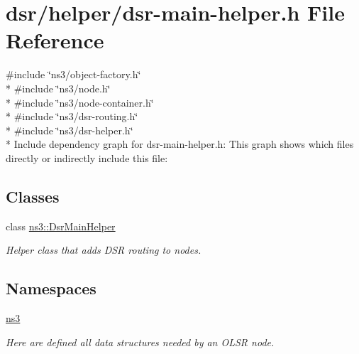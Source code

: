 \hypertarget{dsr-main-helper_8h}{}\section{dsr/helper/dsr-\/main-\/helper.h File Reference}
\label{dsr-main-helper_8h}
{\ttfamily \#include \char`\"{}ns3/object-\/factory.\+h\char`\"{}}\\*
{\ttfamily \#include \char`\"{}ns3/node.\+h\char`\"{}}\\*
{\ttfamily \#include \char`\"{}ns3/node-\/container.\+h\char`\"{}}\\*
{\ttfamily \#include \char`\"{}ns3/dsr-\/routing.\+h\char`\"{}}\\*
{\ttfamily \#include \char`\"{}ns3/dsr-\/helper.\+h\char`\"{}}\\*
Include dependency graph for dsr-\/main-\/helper.h\+:
This graph shows which files directly or indirectly include this file\+:
\subsection*{Classes}
\begin{DoxyCompactItemize}
\item 
class \hyperlink{classns3_1_1DsrMainHelper}{ns3\+::\+Dsr\+Main\+Helper}
\begin{DoxyCompactList}\small\item\em Helper class that adds D\+SR routing to nodes. \end{DoxyCompactList}\end{DoxyCompactItemize}
\subsection*{Namespaces}
\begin{DoxyCompactItemize}
\item 
 \hyperlink{namespacens3}{ns3}
\begin{DoxyCompactList}\small\item\em Here are defined all data structures needed by an O\+L\+SR node. \end{DoxyCompactList}\end{DoxyCompactItemize}
